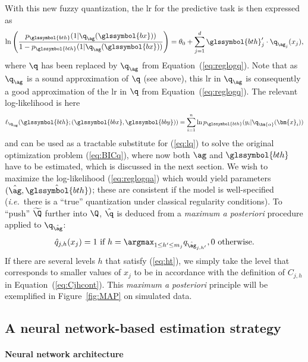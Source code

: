 With this new fuzzy quantization, the \gls{lr} for the predictive task is then expressed as
\begin{equation}
    \label{eq:reglogqa}
    \ln \left( \dfrac{p_{\glssymbol{bth}}(1|\q_{\ag} (\glssymbol{bx}))}{1 - p_{\glssymbol{bth}}(1|\q_{\ag} (\glssymbol{bx}))} \right) = \theta_0 + \sum_{j=1}^d {\glssymbol{bth}_j' \cdot \q_{\ag_{j}}(x_j)},
\end{equation}
where $\q$ has been replaced by $\q_{\ag}$ from Equation~(\ref{eq:reglogq}).
Note that as $\q_{\ag}$ is a sound approximation of $\q$ (see above), this \gls{lr} in $\q_{\ag}$ is consequently a good approximation of the \gls{lr} in $\q$ from Equation~(\ref{eq:reglogq}). The relevant log-likelihood is here 
\begin{equation}
    \label{eq:lqa}
    \ell_{\q_{\ag}}(\glssymbol{bth} ; (\glssymbol{bbx},\glssymbol{bby}))=\sum_{i=1}^n \ln p_{\glssymbol{bth}}(y_i|\q_{\bm{\alpha}}(\bm{x}_i))
\end{equation}
and can be used as a tractable substitute for (\ref{eq:lq}) to solve the original optimization problem (\ref{eq:BICq}), where now both $\ag$ and $\glssymbol{bth}$ have to be estimated, which is discussed in the next section. We wish to maximize the log-likelihood (\ref{eq:reglogqa}) which would yield parameters $(\hat{\ag},\hat{\glssymbol{bth}})$; these are consistent if the model is well-specified (\textit{i.e.}\ there is a ``true'' quantization under classical regularity conditions). To ``push'' $\widetilde{\Q}$ further into $\Q$, $\hat{\q}$ is deduced from a \textit{maximum a posteriori} procedure applied to $\q_{\hat{\ag}}$:
\begin{equation}
    \label{eq:ht}
    \hat{q}_{j,h}(x_j) = 1 \text{ if } h = \argmax_{1 \leq h' \leq m_j} q_{\hat{\ag}_{j,h'}}, 0 \text{ otherwise.}
\end{equation}
If there are several levels $h$ that satisfy (\ref{eq:ht}), we simply take the level that corresponds to smaller values of $x_j$ to be in accordance with the definition of $C_{j,h}$ in Equation~(\ref{eq:Cjhcont}). This {\it maximum a posteriori} principle will be exemplified in Figure~\ref{fig:MAP} on simulated data.


\subsection{A neural network-based estimation strategy} \label{sec:estim}

\paragraph{Neural network architecture}

